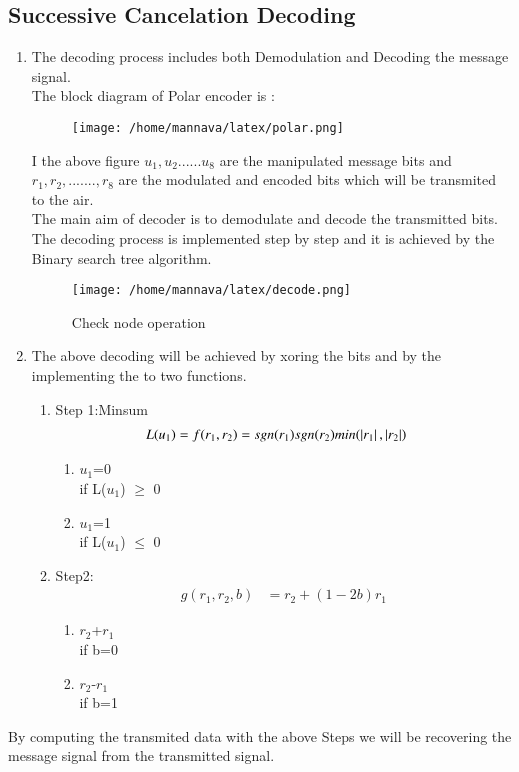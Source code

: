 \documentclass[journal,5pt,twocolumn]{IEEEtran}
\begin{document}
\subsection{\textbf{Successive Cancelation Decoding}}
\begin{enumerate}
\item The decoding process includes both Demodulation and Decoding the message signal.\\
The block diagram of Polar encoder is : \\
\begin{figure}[!ht]
\begin{center}
\texttt{[image: /home/mannava/latex/polar.png]}
\end{center}
\label{fig : check}
\end{figure}
I the above figure $u_1,u_2......u_8$ are the manipulated message bits and $r_1,r_2,.......,r_8$ are the modulated and encoded bits which will be transmited to the air. \\
The main aim of decoder is to demodulate and decode the transmitted bits.\\
The decoding process is implemented step by step and it is achieved by the Binary search tree algorithm.\\
\begin{figure}[!ht]
\begin{center}
\texttt{[image: /home/mannava/latex/decode.png]}
\end{center}
\caption{Check node operation}
\label{fig : check}
\end{figure}
\item The above decoding will be achieved by xoring the bits and by the implementing the to two functions.\\
\begin{enumerate}
\item Step 1:Minsum
\begin{align}
L(u_1)&=f(r_1,r_2)=sgn(r_1)sgn(r_2)min(\left\vert r_1\right\vert,\left\vert r_2\right\vert) 
\end{align}
\begin{enumerate}
\item $u_1$=0 \\
if L($u_1$) $\ge$ 0
\item $u_1$=1 \\
if L($u_1$) $\le$ 0
\end{enumerate}
\item Step2:
\begin{align}
g(r_1,r_2,b)&=r_2+(1-2b)r_1
\end{align}
\begin{enumerate}
\item $r_2$+$r_1$\\
if b=0
\item $r_2$-$r_1$\\
if b=1
\end{enumerate}
\end{enumerate}
 \end{enumerate}
 By computing the transmited data with the above Steps we will be recovering the message signal from the transmitted signal.
\end{document}

